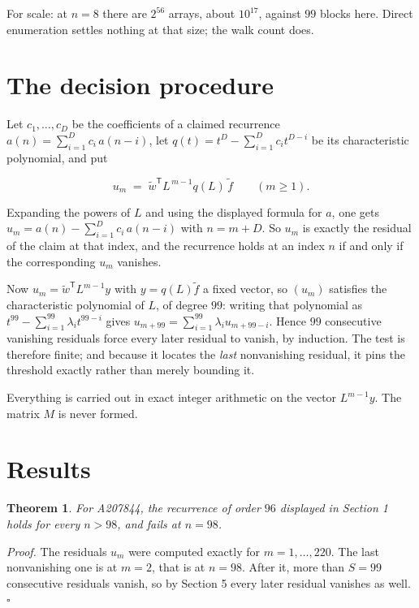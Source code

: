 \documentclass[11pt]{article}
\newtheorem{theorem}{Theorem}
\theoremstyle{definition}
\begin{document}
For scale: at $n = 8$ there are $2^{56}$ arrays, about $10^{17}$, against $99$ blocks here. Direct enumeration settles nothing at that size; the walk count does.

\section{The decision procedure}

Let $c_1,\dots,c_D$ be the coefficients of a claimed recurrence $a(n) = \sum_{i=1}^{D} c_i\,a(n-i)$, let $q(t) = t^{D} - \sum_{i=1}^{D} c_i t^{D-i}$ be its characteristic polynomial, and put

\[u_m \;=\; \tilde w^{\mathsf T} L^{\,m-1} q(L)\,\tilde f \qquad (m \ge 1).\]

Expanding the powers of $L$ and using the displayed formula for $a$, one gets $u_m = a(n) - \sum_{i=1}^{D} c_i\,a(n-i)$ with $n = m + D$. So $u_m$ is exactly the residual of the claim at that index, and the recurrence holds at an index $n$ if and only if the corresponding $u_m$ vanishes.

Now $u_m = \tilde w^{\mathsf T} L^{m-1} y$ with $y = q(L)\tilde f$ a fixed vector, so $(u_m)$ satisfies the characteristic polynomial of $L$, of degree $99$: writing that polynomial as $t^{99} - \sum_{i=1}^{99} \lambda_i t^{99-i}$ gives $u_{m+99} = \sum_{i=1}^{99} \lambda_i u_{m+99-i}$. Hence $99$ consecutive vanishing residuals force every later residual to vanish, by induction. The test is therefore finite; and because it locates the {\itshape last} nonvanishing residual, it pins the threshold exactly rather than merely bounding it.

Everything is carried out in exact integer arithmetic on the vector $L^{m-1}y$. The matrix $M$ is never formed.

\section{Results}

\begin{theorem} For A207844, the recurrence of order $96$ displayed in Section 1 holds for every $n > 98$, and fails at $n = 98$.\end{theorem}

{\itshape Proof.} The residuals $u_m$ were computed exactly for $m = 1,\dots,220$. The last nonvanishing one is at $m = 2$, that is at $n = 98$. After it, more than $S = 99$ consecutive residuals vanish, so by Section 5 every later residual vanishes as well. $\square$
\end{document}
